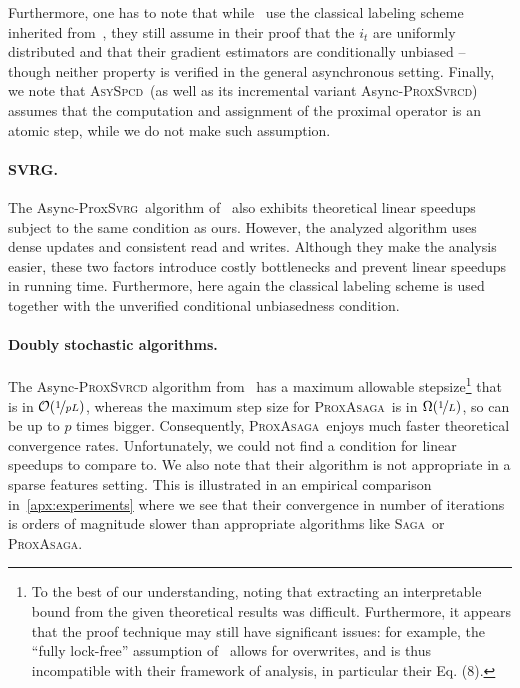 \documentclass{article}
\newcommand{\PASAGA}{\textsc{ProxAsaga}}
\newcommand{\SAGA}{\textsc{Saga}}
\newcommand{\ProxSVRG}{Prox\textsc{Svrg}}
\newcommand{\AsySPCD}{\textsc{AsySpcd}}
\begin{document}
Furthermore, one has to note that while~\citet{liu2015asynchronous2} use the classical labeling scheme inherited from~\citet{hogwild2011}, they still assume in their proof that the $i_t$ are uniformly distributed and that their gradient estimators are conditionally unbiased -- though neither property is verified in the general asynchronous setting. Finally, we note that \AsySPCD\ (as well as its incremental variant Async-\textsc{ProxSvrcd}) assumes that the computation and assignment of the proximal operator is an atomic step, while we do not make such assumption.

%
\paragraph{SVRG.}
The Async-\ProxSVRG\ algorithm of~\citet{meng2017aaai} also exhibits theoretical linear speedups subject to the same condition as ours.
However, the analyzed algorithm uses dense updates and consistent read and writes.
Although they make the analysis easier, these two factors introduce costly bottlenecks and prevent linear speedups in running time.
Furthermore, here again the classical labeling scheme is used together with the unverified conditional unbiasedness condition.


\paragraph{Doubly stochastic algorithms.}
The Async-\textsc{ProxSvrcd} algorithm from~\citet{meng2017aaai,gu2016asynchronous} has a maximum allowable stepsize\footnote{To the best of our understanding, noting that extracting an interpretable bound from the given theoretical results was difficult.
	Furthermore, it appears that the proof technique may still have significant issues: for example, the ``fully lock-free'' assumption of~\citet{gu2016asynchronous} allows for overwrites, and is thus incompatible with their framework of analysis, in particular their Eq. (8).}
 that is in $\mathcal{O}(\nicefrac{1}{pL})$, whereas the maximum step size for \PASAGA\ is in $\Omega(\nicefrac{1}{L})$, so can be up to $p$ times bigger.
Consequently, \PASAGA\ enjoys much faster theoretical convergence rates.
Unfortunately, we could not find a condition for linear speedups to compare to.
We also note that their algorithm is not appropriate in a sparse features setting.
This is illustrated in an empirical comparison in~\ref{apx:experiments} where we see that their convergence in number of iterations is orders of magnitude slower than appropriate algorithms like \SAGA\ or \PASAGA.
%
\end{document}
